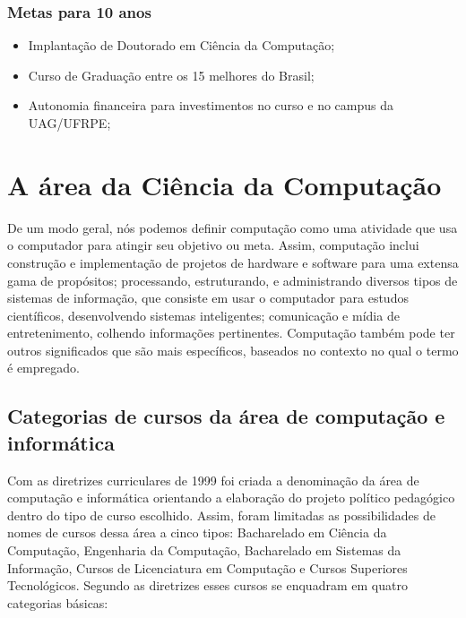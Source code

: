 \documentclass[
	12pt,				%
	openright,			%
  oneside,     %
	a4paper,			%
	english,			%
	french,				%
	spanish,			%
	brazil				%
	]{abntex2}
\begin{document}
\subsection*{Metas para 10 anos}

\begin{itemize}
  \item Implantação de Doutorado em Ciência da Computação;
  \item Curso de Graduação entre os 15 melhores do Brasil;
  \item Autonomia financeira para investimentos no curso e no campus da
UAG/UFRPE;
\end{itemize}


%
%


\chapter{A área da Ciência da Computação}

De um modo geral, nós podemos definir computação como uma atividade que usa o
computador para atingir seu objetivo ou meta. Assim, computação inclui
construção e implementação de projetos de hardware e software para uma extensa gama de propósitos; processando, estruturando, e administrando diversos tipos de sistemas de informação, que consiste em usar o computador para estudos científicos, desenvolvendo sistemas
inteligentes; comunicação e mídia de
entretenimento, colhendo informações pertinentes. Computação também pode ter outros significados que são mais específicos, baseados no contexto no qual o termo é empregado.

\section{Categorias de cursos da área de computação e informática}

Com as diretrizes curriculares de 1999 foi criada a denominação da área de
computação e informática orientando a elaboração do projeto político pedagógico
dentro do tipo de curso escolhido. Assim, foram limitadas as possibilidades de
nomes de cursos dessa área a cinco tipos: Bacharelado em Ciência da Computação,
Engenharia da Computação, Bacharelado em Sistemas da Informação, Cursos de
Licenciatura em Computação e Cursos Superiores Tecnológicos. Segundo as
diretrizes esses cursos se enquadram em quatro categorias básicas:
\end{document}
